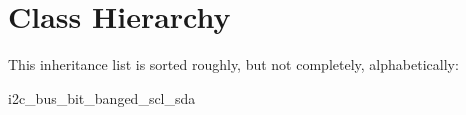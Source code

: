 \section{Class Hierarchy}
This inheritance list is sorted roughly, but not completely, alphabetically\+:\begin{DoxyCompactList}
\item i2c\+\_\+bus\+\_\+bit\+\_\+banged\+\_\+scl\+\_\+sda\begin{DoxyCompactList}
\item {}
\end{DoxyCompactList}
\item {}
\item {}
\item {}
\begin{DoxyCompactList}
\item {}
\end{DoxyCompactList}
\end{DoxyCompactList}
